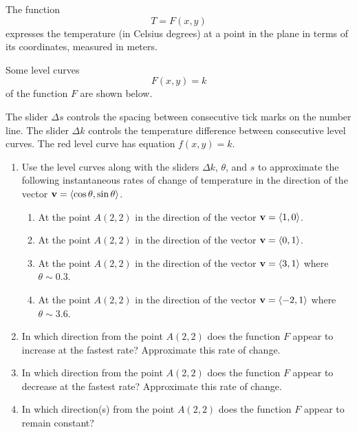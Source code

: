 \documentclass{ximera}
\begin{document}
\begin{question}  \label{Qds54546bd}

The function 
\[
     T= F(x,y) %
\]
expresses the temperature (in Celsius degrees) at a point in the plane in terms of its coordinates, measured in meters.

Some level curves 
\[
     F(x,y)=k
\]
of the function $F$ are shown below. 

The slider $\Delta s$ controls the spacing between consecutive tick marks on the number line. The slider $\Delta k$ controls the temperature difference between consecutive level curves. The red level curve has equation $f(x,y)=k$.

\begin{enumerate}
\item Use the level curves along with the sliders $\Delta k$, $\theta$, and $s$ to approximate the following instantaneous rates of change of temperature in the direction of the vector ${\bf v} = \langle \cos\theta, \sin\theta \rangle$. 



\begin{enumerate}

\item At the point $A(2,2)$ in the direction of the vector ${\bf v} = \langle 1, 0 \rangle$.

\item  At the point $A(2,2)$ in the direction of the vector ${\bf v} = \langle 0,1 \rangle$.

\item  At the point $A(2,2)$ in the direction of the vector ${\bf v} = \langle 3,1 \rangle$ where $\theta \sim 0.3$.

\item  At the point $A(2,2)$ in the direction of the vector ${\bf v} = \langle -2,1 \rangle$ where $\theta \sim 3.6$.

\end{enumerate}

\item In which direction from the point $A(2,2)$ does the function $F$ appear to increase at the fastest rate? Approximate this rate of change.

\item In which direction from the point $A(2,2)$ does the function $F$ appear to decrease at the fastest rate? Approximate this rate of change.

\item In which direction(s) from the point $A(2,2)$ does the function $F$ appear to remain constant? 



\end{enumerate}
\end{question}
\end{document}
